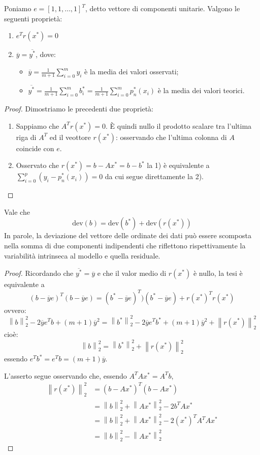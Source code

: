 \documentclass[12pt]{report}
\newcounter{proposition}
\begin{document}
Poniamo $e = [1, 1, \dots, 1]^T$, detto vettore di componenti unitarie. Valgono le seguenti proprietà:
\begin{enumerate}
	\item $e^Tr\left(x^*\right) = 0$
	\item $\overline{y} = \overline{y^*}$, dove:
	\begin{itemize}
		\item $\overline{y} = \frac{1}{m+1}\sum_{i=0}^{m}y_i$ è la media dei valori osservati;
		\item $\overline{y^*} = \frac{1}{m+1}\sum_{i=0}^{m}b_i^* = \frac{1}{m+1}\sum_{i=0}^{m}p_n^*(x_i)$ è la media dei valori teorici.
	\end{itemize}
\end{enumerate}
\begin{proof} Dimostriamo le precedenti due proprietà:
\begin{enumerate}
	\item Sappiamo che $A^Tr(x^*) = 0$. È quindi nullo il prodotto scalare tra l'ultima riga di $A^T$ ed il veottore $r\left(x^*\right)$: osservando che l'ultima colonna di $A$ coincide con $e$.
	\item Osservato che $r\left(x^*\right) = b - Ax^* = b - b^*$ la 1) è equivalente a $\sum_{i=0}^{p}(y_i - p_n^*(x_i)) = 0$ da cui segue direttamente la 2).
\end{enumerate}
\end{proof}
\begin{proposition}{}{}
Vale che
\[
\text{dev}(b) = \text{dev}\left(b^*\right) + \text{dev}\left(r\left(x^*\right)\right)
\]
In parole, la deviazione del vettore delle ordinate dei dati può essere scomposta nella somma di due componenti indipendenti che riflettono rispettivamente la variabilità intrinseca al modello e quella residuale.
\end{proposition}
\begin{proof}
	Ricordando che $\overline{y^*} = \overline{y}$ e che il valor medio di $r\left(x^*\right)$ è nullo, la tesi è equivalente a
	\[
	(b - \overline{y}e)^T(b-\overline{y}e) = (b^* - \overline{y}e)^T)(b^* - \overline{y}e) + r\left(x^*\right)^Tr\left(x^*\right)
	\]
	ovvero:
\[
\left\|b\right\|_2^2 - 2\overline{y}e^Tb + (m+1)\overline{y}^2 = \left\|b^*\right\|_2^2 - 2\overline{y}e^Tb^* + (m+1)\overline{y}^2 + \left\|r\left(x^*\right)\right\|_2^2
\]
cioè:
\[
\left\|b\right\|_2^2 = \left\|b^*\right\|_2^2 + \left\|r\left(x^*\right)\right\|_2^2
\]
essendo $e^Tb^* = e^Tb = (m+1)\overline{y}$.

L'asserto segue osservando che, essendo $A^TAx^* = A^Tb$,
\begin{align*}
	\left\|r\left(x^*\right)\right\|_2^2 &= \left(b - Ax^*\right)^T\left(b-Ax^*\right) \\
	&= \left\|b\right\|_2^2 + \left\|Ax^*\right\|_2^2 - 2b^TAx^* \\
	&= \left\|b\right\|_2^2 + \left\|Ax^*\right\|_2^2 - 2\left(x^*\right)^TA^TAx^* \\
	&= \left\|b\right\|_2^2 - \left\|Ax^*\right\|_2^2
\end{align*}
\end{proof}
\end{document}
